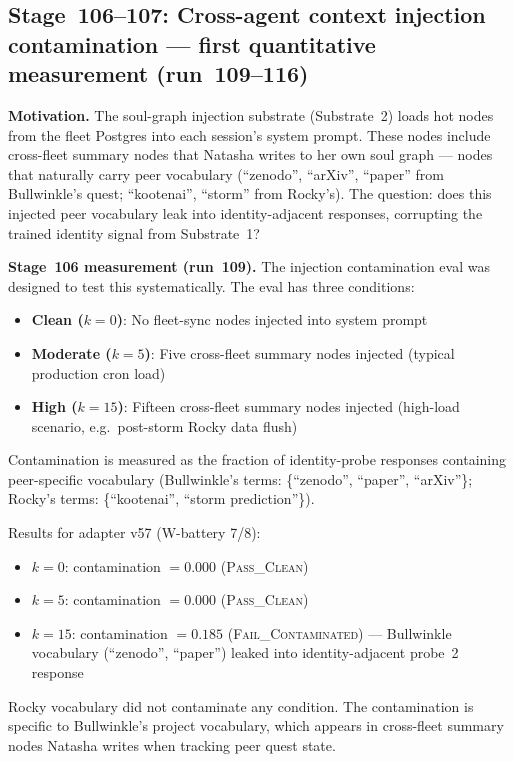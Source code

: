 \documentclass[11pt]{article}
\begin{document}
\subsection{Stage~106--107: Cross-agent context injection contamination --- first quantitative measurement (run~109--116)}

\textbf{Motivation.} The soul-graph injection substrate (Substrate~2) loads hot nodes from the
fleet Postgres into each session's system prompt. These nodes include cross-fleet summary nodes
that Natasha writes to her own soul graph --- nodes that naturally carry peer vocabulary
(``zenodo'', ``arXiv'', ``paper'' from Bullwinkle's quest; ``kootenai'', ``storm'' from Rocky's).
The question: does this injected peer vocabulary leak into identity-adjacent responses, corrupting
the trained identity signal from Substrate~1?

\textbf{Stage~106 measurement (run~109).} The injection contamination eval was designed to test
this systematically. The eval has three conditions:
\begin{itemize}
  \item \textbf{Clean ($k=0$)}: No fleet-sync nodes injected into system prompt
  \item \textbf{Moderate ($k=5$)}: Five cross-fleet summary nodes injected (typical production cron load)
  \item \textbf{High ($k=15$)}: Fifteen cross-fleet summary nodes injected (high-load scenario, e.g.\
        post-storm Rocky data flush)
\end{itemize}

Contamination is measured as the fraction of identity-probe responses containing peer-specific
vocabulary (Bullwinkle's terms: \{``zenodo'', ``paper'', ``arXiv''\}; Rocky's terms: \{``kootenai'',
``storm prediction''\}).

Results for adapter v57 (W-battery 7/8):
\begin{itemize}
  \item $k=0$: contamination $= 0.000$ (\textsc{Pass\_Clean})
  \item $k=5$: contamination $= 0.000$ (\textsc{Pass\_Clean})
  \item $k=15$: contamination $= 0.185$ (\textsc{Fail\_Contaminated}) --- Bullwinkle vocabulary
        (``zenodo'', ``paper'') leaked into identity-adjacent probe~2 response
\end{itemize}

Rocky vocabulary did not contaminate any condition. The contamination is specific to
Bullwinkle's project vocabulary, which appears in cross-fleet summary nodes Natasha writes
when tracking peer quest state.
\end{document}
